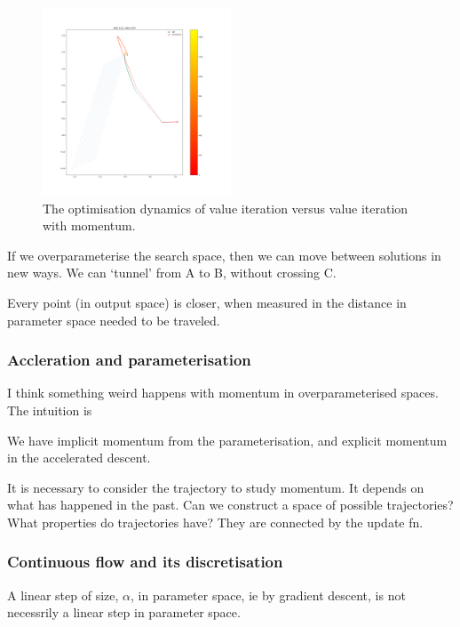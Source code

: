 \begin{figure}
\centering
\includegraphics[width=0.5\textwidth,height=0.5\textheight]{../../pictures/figures/vi_sgd-vs-vi_mom.png}
\caption{The optimisation dynamics of value iteration versus value iteration with momentum.}
\end{figure}

If we overparameterise the search space, then we can move between solutions in new ways. We can `tunnel' from A to B, without crossing C.

Every point (in output space) is closer, when measured in the distance in parameter space needed to be traveled.


\subsubsection{Accleration and parameterisation}

I think something weird happens with momentum in overparameterised spaces. The intuition is

We have implicit momentum from the parameterisation, and explicit momentum in the accelerated descent.

It is necessary to consider the trajectory to study momentum. It depends
on what has happened in the past. Can we construct a space of possible
trajectories? What properties do trajectories have? They are connected
by the update fn.


\subsubsection{Continuous flow and its discretisation}

A linear step of size, \(\alpha\), in parameter space, ie by gradient
descent, is not necessrily a linear step in parameter space.

